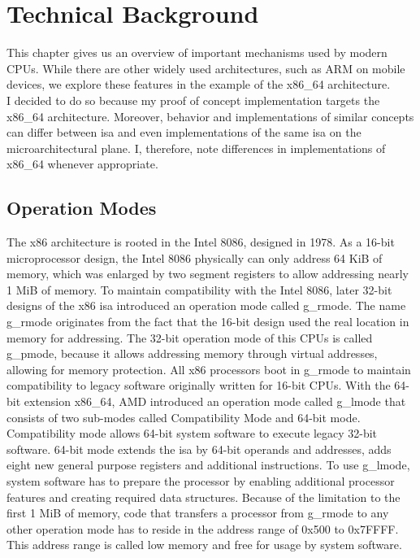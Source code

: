 \section{Technical Background}
\label{sec:state:technical}
This chapter gives us an overview of important mechanisms used by modern CPUs.
While there are other widely used architectures, such as ARM on mobile devices,
we explore these features in the example of the x86\_64 architecture. \\

I decided to do so because my proof of concept implementation targets the
x86\_64 architecture. Moreover, behavior and implementations of similar concepts
can differ between \gls{isa} and even implementations of the
same \gls{isa} on the microarchitectural plane. I, therefore, note
differences in implementations of x86\_64 whenever appropriate.

\subsection{Operation Modes}
\label{sec:state:technical:modes}
The x86 architecture is rooted in the Intel 8086, designed in 1978. As a 16-bit
microprocessor design, the Intel 8086 physically can only address 64 KiB of
memory, which was enlarged by two segment registers to allow addressing nearly 1
MiB of memory. To maintain compatibility with the Intel 8086, later 32-bit
designs of the x86 \gls{isa} introduced an operation mode called \gls{g_rmode}.
The name \gls{g_rmode} originates from the fact that the 16-bit design used the
real location in memory for addressing. The 32-bit operation mode of this CPUs
is called \gls{g_pmode}, because it allows addressing memory through virtual
addresses, allowing for memory protection. All x86 processors boot in
\gls{g_rmode} to maintain compatibility to legacy software originally written
for 16-bit CPUs. With the 64-bit extension x86\_64, AMD introduced an operation
mode called \gls{g_lmode} that consists of two sub-modes called Compatibility
Mode and 64-bit mode. Compatibility mode allows 64-bit system software to
execute legacy 32-bit software. 64-bit mode extends the \gls{isa} by 64-bit
operands and addresses, adds eight new general purpose registers and additional
instructions. To use \gls{g_lmode}, system software has to prepare the processor
by enabling additional processor features and creating required data structures.
Because of the limitation to the first 1 MiB of memory, code that transfers a
processor from \gls{g_rmode} to any other operation mode has to reside in the
address range of 0x500 to 0x7FFFF. This address range is called low memory and
free for usage by system software.

